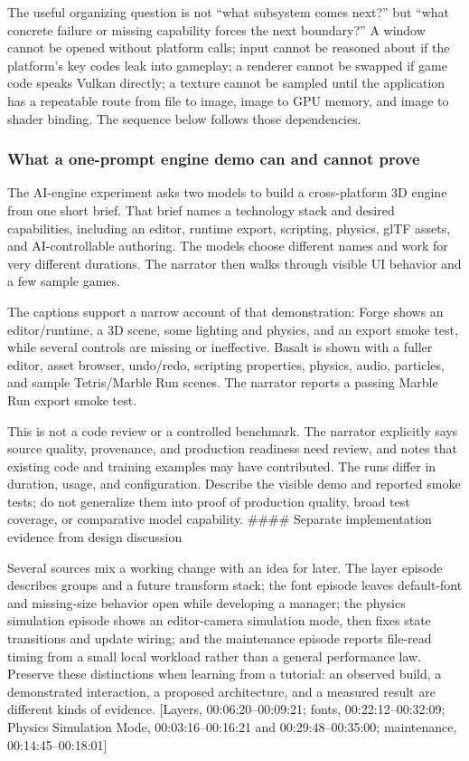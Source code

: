 The useful organizing question is not ``what subsystem comes next?'' but ``what concrete failure or missing capability forces the next boundary?'' A window cannot be opened without platform calls; input cannot be reasoned about if the platform's key codes leak into gameplay; a renderer cannot be swapped if game code speaks Vulkan directly; a texture cannot be sampled until the application has a repeatable route from file to image, image to GPU memory, and image to shader binding. The sequence below follows those dependencies.

\subsubsection{What a one-prompt engine demo can and cannot prove}\label{06-engine-ii-ch042-what-a-one-prompt-engine-demo-can-and-cannot-prove}

The AI-engine experiment asks two models to build a cross-platform 3D engine from one short brief. That brief names a technology stack and desired capabilities, including an editor, runtime export, scripting, physics, glTF assets, and AI-controllable authoring. The models choose different names and work for very different durations. The narrator then walks through visible UI behavior and a few sample games.

The captions support a narrow account of that demonstration: Forge shows an editor/runtime, a 3D scene, some lighting and physics, and an export smoke test, while several controls are missing or ineffective. Basalt is shown with a fuller editor, asset browser, undo/redo, scripting properties, physics, audio, particles, and sample Tetris/Marble Run scenes. The narrator reports a passing Marble Run export smoke test.

This is not a code review or a controlled benchmark. The narrator explicitly says source quality, provenance, and production readiness need review, and notes that existing code and training examples may have contributed. The runs differ in duration, usage, and configuration. Describe the visible demo and reported smoke tests; do not generalize them into proof of production quality, broad test coverage, or comparative model capability. \#\#\#\# Separate implementation evidence from design discussion

Several sources mix a working change with an idea for later. The layer episode describes groups and a future transform stack; the font episode leaves default-font and missing-size behavior open while developing a manager; the physics simulation episode shows an editor-camera simulation mode, then fixes state transitions and update wiring; and the maintenance episode reports file-read timing from a small local workload rather than a general performance law. Preserve these distinctions when learning from a tutorial: an observed build, a demonstrated interaction, a proposed architecture, and a measured result are different kinds of evidence. {[}Layers, 00:06:20--00:09:21; fonts, 00:22:12--00:32:09; Physics Simulation Mode, 00:03:16--00:16:21 and 00:29:48--00:35:00; maintenance, 00:14:45--00:18:01{]}

